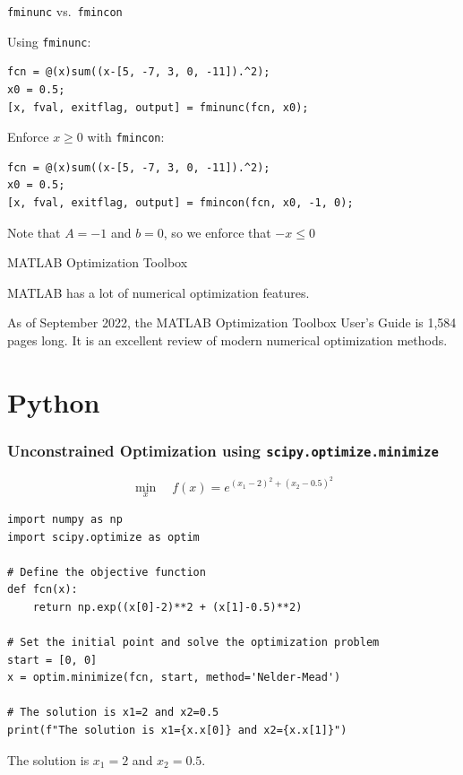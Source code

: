 \documentclass{beamer}
\begin{document}
\begin{frame}[fragile]{\texttt{fminunc} vs.\ \texttt{fmincon}}

Using \texttt{fminunc}:
        \begin{lstlisting}[style=Matlab]
fcn = @(x)sum((x-[5, -7, 3, 0, -11]).^2);
x0 = 0.5;
[x, fval, exitflag, output] = fminunc(fcn, x0);
        \end{lstlisting}
 
Enforce $x \geq 0$ with \texttt{fmincon}:
        \begin{lstlisting}[style=Matlab]
fcn = @(x)sum((x-[5, -7, 3, 0, -11]).^2);
x0 = 0.5;
[x, fval, exitflag, output] = fmincon(fcn, x0, -1, 0);
        \end{lstlisting}
Note that $A = -1$ and $b=0$, so we enforce that $-x \leq 0$ 

\end{frame}


\begin{frame}[fragile]{MATLAB Optimization Toolbox}

MATLAB has a lot of numerical optimization features.

As of September 2022, the MATLAB Optimization Toolbox User's Guide is 1,584 pages long.  It is an excellent review of modern numerical optimization methods.

\end{frame}


\section{Python}
\addtocounter{framenumber}{-4}
\begin{frame}[fragile]
\frametitle{Unconstrained Optimization using \texttt{scipy.optimize.minimize}}
$$
\min_{x} \quad f(x) = e^{(x_1-2)^2 + (x_2-0.5)^2}
$$
\begin{lstlisting}[style=python]
import numpy as np
import scipy.optimize as optim

# Define the objective function
def fcn(x):
    return np.exp((x[0]-2)**2 + (x[1]-0.5)**2)

# Set the initial point and solve the optimization problem
start = [0, 0]
x = optim.minimize(fcn, start, method='Nelder-Mead')

# The solution is x1=2 and x2=0.5
print(f"The solution is x1={x.x[0]} and x2={x.x[1]}")
\end{lstlisting}

The solution is $x_1 = 2$ and $x_2 = 0.5$.
\end{frame}
\end{document}
